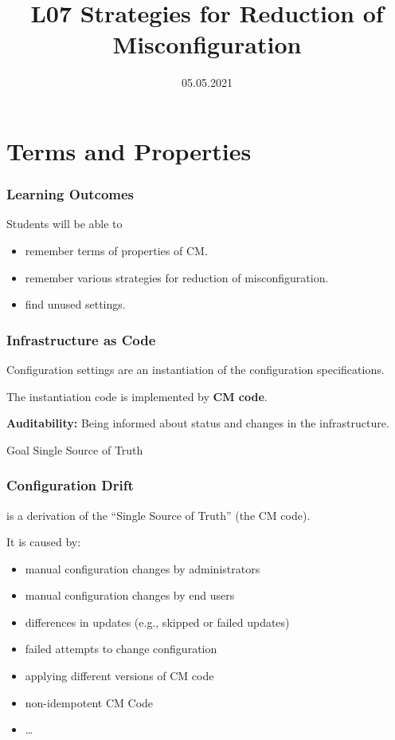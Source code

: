 

\title{L07 Strategies for Reduction of Misconfiguration}
\date{05.05.2021}




\section{Terms and Properties}

\begin{frame}
	\frametitle{Learning Outcomes}
	Students will be able to
	\begin{itemize}
	\item remember terms of properties of CM.
	\item remember various strategies for reduction of misconfiguration.
	\item find unused settings.
	\end{itemize}
\end{frame}

\begin{frame}
	\frametitle{Infrastructure as Code}

	Configuration settings are an instantiation of the configuration specifications.
	\vspace{1em}

	The instantiation code is implemented by \textbf{CM code}.
	\vspace{1em}

	\textbf{Auditability:}
	Being informed about status and changes in the infrastructure.
	\vspace{1em}

	\begin{alertblock}{Goal}
	Single Source of Truth
	\end{alertblock}
\end{frame}

\begin{frame}
	\frametitle{Configuration Drift}

	is a derivation of the ``Single Source of Truth'' (the CM code).

	\vspace{1em}
	It is caused by:

	\pause

	\begin{itemize}[<+-| alert@+>]
	\item manual configuration changes by administrators
	\item manual configuration changes by end users
	\item differences in updates (e.g., skipped or failed updates)
	\item failed attempts to change configuration
	\item applying different versions of CM code
	\item non-idempotent CM Code
	\item \dots
	\end{itemize}
\end{frame}

